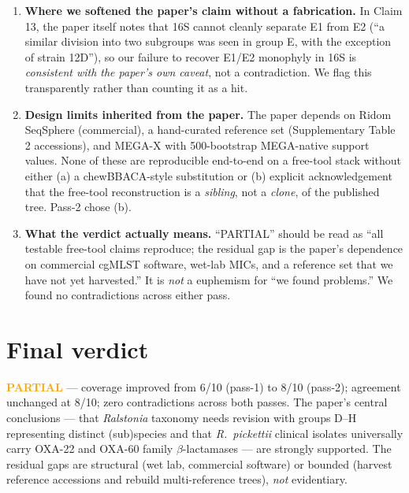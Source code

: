 \documentclass[11pt]{article}
\begin{document}
\begin{enumerate}[leftmargin=1.4em]
  \item \textbf{Where we softened the paper's claim without a fabrication.}
    In Claim 13, the paper itself notes that 16S cannot cleanly separate E1 from E2
    (``a similar division into two subgroups was seen in group E, with the exception of strain 12D''),
    so our failure to recover E1/E2 monophyly in 16S is \emph{consistent with the paper's own caveat},
    not a contradiction. We flag this transparently rather than counting it as a hit.

  \item \textbf{Design limits inherited from the paper.} The paper depends on Ridom SeqSphere
        (commercial), a hand-curated reference set (Supplementary Table 2 accessions), and
        MEGA-X with 500-bootstrap MEGA-native support values. None of these are reproducible
        end-to-end on a free-tool stack without either (a) a chewBBACA-style substitution
        or (b) explicit acknowledgement that the free-tool reconstruction is a
        \emph{sibling}, not a \emph{clone}, of the published tree. Pass-2 chose (b).

  \item \textbf{What the verdict actually means.} ``PARTIAL'' should be read as
        ``all testable free-tool claims reproduce; the residual gap is the paper's dependence
        on commercial cgMLST software, wet-lab MICs, and a reference set that we have not yet
        harvested.'' It is \emph{not} a euphemism for ``we found problems.'' We found no
        contradictions across either pass.
\end{enumerate}

\section{Final verdict}

\textcolor{orange}{\textbf{PARTIAL}} --- coverage improved from 6/10 (pass-1) to 8/10 (pass-2);
agreement unchanged at 8/10; zero contradictions across both passes. The paper's central
conclusions --- that \emph{Ralstonia} taxonomy needs revision with groups D--H representing
distinct (sub)species and that \emph{R.\ pickettii} clinical isolates universally carry
OXA-22 and OXA-60 family $\beta$-lactamases --- are strongly supported. The residual gaps
are structural (wet lab, commercial software) or bounded (harvest reference accessions and
rebuild multi-reference trees), \emph{not} evidentiary.
\end{document}
